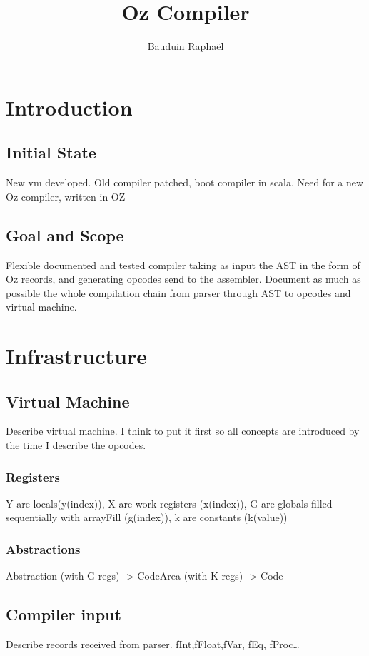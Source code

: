 \documentclass[draft,a4paper]{memoir}
\author{Bauduin Raphaël}
\title{Oz Compiler}
\begin{document}
\ifdraftdoc
{}
\fi

\immediate{} 

\maketitle
\tableofcontents


\chapter{Introduction}
\section{Initial State}
New vm developed.
Old compiler patched, boot compiler in scala.
Need for a new Oz compiler, written in OZ

\section{Goal and Scope}
Flexible documented and tested compiler taking as input the AST in the form of Oz records, and generating opcodes send to the assembler.
Document as much as possible the whole compilation chain from parser through AST to opcodes and virtual machine.

\chapter{Infrastructure}
\section{Virtual Machine}
Describe virtual machine. I think to put it first so all concepts are introduced by the time I describe the opcodes.
\subsection{Registers}
Y are locals(y(index)), X are work registers (x(index)), G are globals filled sequentially with arrayFill (g(index)), k are constants (k(value))
\subsection{Abstractions}
Abstraction (with G regs)  -> CodeArea (with K regs) -> Code
\section{Compiler input}
Describe records received from parser.
fInt,fFloat,fVar, fEq, fProc\ldots
\end{document}
